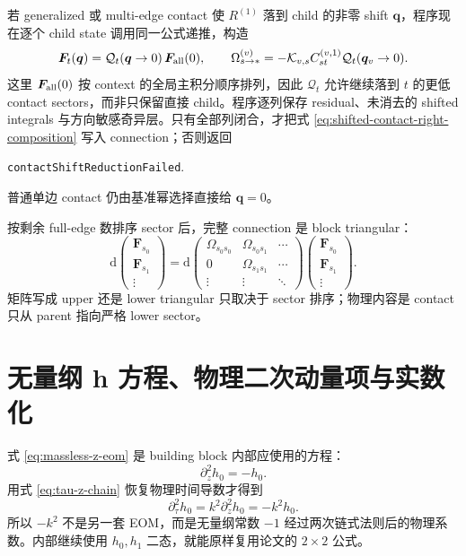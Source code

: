 \documentclass[11pt,a4paper]{ctexart}
\newcommand{\dd}{\mathrm d}
\begin{document}
若 generalized 或 multi-edge contact 使 $R^{(1)}$ 落到 child 的非零 shift $\bm q$，程序现在逐个 child state 调用同一公式递推，构造
\begin{equation}
 \bm F_t(\bm q)=\mathcal Q_t(\bm q\to0)\,\bm F_{\rm all}(0),
 \qquad
 \Omega_{s\to *}^{(v)}
 =-\mathcal K_{v,s}C_{st}^{(v,1)}\mathcal Q_t(\bm q_v\to0).
 \label{eq:shifted-contact-right-composition}
\end{equation}
这里 $\bm F_{\rm all}(0)$ 按 context 的全局主积分顺序排列，因此 $\mathcal Q_t$ 允许继续落到 $t$ 的更低 contact sectors，而非只保留直接 child。程序逐列保存 residual、未消去的 shifted integrals 与方向敏感奇异层。只有全部列闭合，才把式 \eqref{eq:shifted-contact-right-composition} 写入 connection；否则返回
\begin{center}
 \texttt{contactShiftReductionFailed}.
\end{center}
普通单边 contact 仍由基准幂选择直接给 $\bm q=0$。

按剩余 full-edge 数排序 sector 后，完整 connection 是 block triangular：
\begin{equation}
 \dd
 \begin{pmatrix}
 \bm F_{s_0}\\\bm F_{s_1}\\\vdots
 \end{pmatrix}
 =\dd
 \begin{pmatrix}
 \Omega_{s_0s_0}&\Omega_{s_0s_1}&\cdots\\
 0&\Omega_{s_1s_1}&\cdots\\
 \vdots&\vdots&\ddots
 \end{pmatrix}
 \begin{pmatrix}
 \bm F_{s_0}\\\bm F_{s_1}\\\vdots
 \end{pmatrix}.
 \label{eq:block-triangular-de}
\end{equation}
矩阵写成 upper 还是 lower triangular 只取决于 sector 排序；物理内容是 contact 只从 parent 指向严格 lower sector。

\section{无量纲 h 方程、物理二次动量项与实数化}
\label{sec:physical-k2}

式 \eqref{eq:massless-z-eom} 是 building block 内部应使用的方程：
\begin{equation}
 \partial_z^2h_0=-h_0.
\end{equation}
用式 \eqref{eq:tau-z-chain} 恢复物理时间导数才得到
\begin{equation}
 \boxed{
 \partial_\tau^2h_0
 =k^2\partial_z^2h_0
 =-k^2h_0.
 }
 \label{eq:physical-second-derivative}
\end{equation}
所以 $-k^2$ 不是另一套 EOM，而是无量纲常数 $-1$ 经过两次链式法则后的物理系数。内部继续使用 $h_0,h_1$ 二态，就能原样复用论文的 $2\times2$ 公式。
\end{document}
